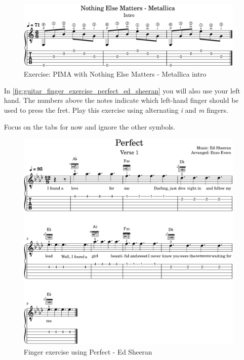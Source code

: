 \begin{figure}[h]
    \centering
    \includegraphics[width=\textwidth]{../../MuseScore/Guitar/NothinElseMatters_Metallica_Intro.png}
    \caption{Exercise: PIMA with Nothing Else Matters - Metallica intro}
    \label{fig:exercise_nothing_else_matters_metallica_intro_pima}
\end{figure}

\newpage

In \autoref{fig:guitar_finger_exercise_perfect_ed_sheeran} you will also use your left hand. The numbers above the notes indicate which left-hand finger should be used to press the fret. Play this exercise using alternating \textit{i} and \textit{m} fingers.

Focus on the tabs for now and ignore the other symbols.

\begin{figure}[h]
    \centering
    \includegraphics[width=\textwidth]{../../MuseScore/Guitar/GuitarPerfectEdSheeranSingleNotesFirstVerse.png}
    \caption{Finger exercise using Perfect - Ed Sheeran}
    \label{fig:guitar_finger_exercise_perfect_ed_sheeran}
\end{figure}